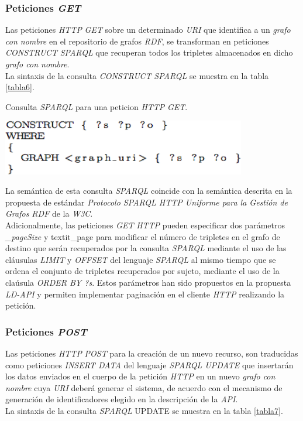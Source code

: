 \subsubsection{Peticiones \textit{GET}}

Las peticiones  \textit{HTTP} \textit{GET} sobre un determinado \textit{URI} que identifica a un \textit{grafo con nombre} en el repositorio de grafos \textit{RDF}, se transforman en peticiones \textit{CONSTRUCT} \textit{SPARQL} que recuperan todos los tripletes almacenados en dicho \textit{grafo con nombre}.\\
La sintaxis de la consulta \textit{CONSTRUCT} \textit{SPARQL} se muestra en la tabla \ref{tabla6}.\\

\begin{table}
\vspace{2.4in}
\caption{Consulta \textit{SPARQL} para una peticion \textit{HTTP} \textit{GET}.}
\includegraphics[width=0.8\textwidth]{tabla6}
\label{tabla6}
\end{table}


La sem\'antica de esta consulta \textit{SPARQL} coincide con la sem\'antica descrita en la propuesta de est\'andar \textit{Protocolo SPARQL HTTP Uniforme para la Gesti\'on de Grafos RDF} de la \textit{W3C}.\\
Adicionalmente, las peticiones \textit{GET} \textit{HTTP} pueden especificar dos par\'ametros \textit{\_pageSize} y textit{\_page} para modificar el n\'umero de tripletes en el grafo de destino que ser\'an recuperados por la consulta \textit{SPARQL} mediante el uso de las cl\'ausulas \textit{LIMIT} y \textit{OFFSET} del lenguaje \textit{SPARQL} al mismo tiempo que se ordena el conjunto de tripletes recuperados por sujeto, mediante el uso de la cla\'usula \textit{ORDER BY ?s}. Estos par\'ametros han sido propuestos en la propuesta \textit{LD-API} y permiten implementar paginaci\'on en el cliente \textit{HTTP} realizando la petici\'on.

\subsubsection{Peticiones \textit{POST}}

Las  peticiones \textit{HTTP} \textit{POST} para la creaci\'on de un nuevo recurso, son traducidas como peticiones \textit{INSERT DATA} del lenguaje \textit{SPARQL UPDATE} que insertar\'an los datos enviados en el cuerpo de la petici\'on \textit{HTTP} en un nuevo \textit{grafo con nombre} cuya \textit{URI} deber\'a generar el sistema, de acuerdo con el mecanismo de generaci\'on de identificadores elegido en la descripci\'on de la \textit{API}.\\
La sintaxis de la consulta \textit{SPARQL} UPDATE se muestra en la tabla \ref{tabla7}.\\


